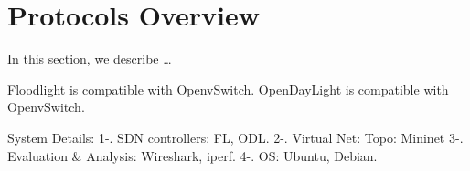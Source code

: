 \chapter{Protocols Overview}\label{ch:protocols} %
In this section, we describe \dots




Floodlight is compatible with OpenvSwitch.
OpenDayLight is compatible with OpenvSwitch.

\cite{Mininet}


System Details:
1-. SDN controllers: FL, ODL.
2-. Virtual Net: Topo: Mininet
3-. Evaluation \& Analysis: Wireshark, iperf.
4-. OS: Ubuntu, Debian.
\bigskip
\bigskip
\bigskip




\bigskip
\bigskip
\bigskip




\bigskip
\bigskip
\bigskip








